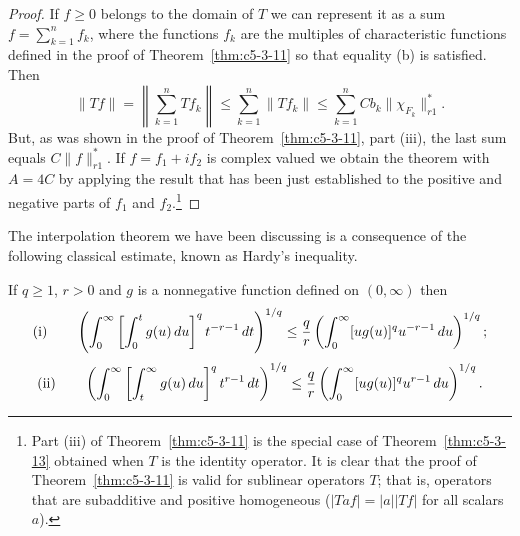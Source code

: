 \begin{proof}
If $f \geq 0$ belongs to the domain of $T$ we can represent it as a sum
$f = \sum_{k=1}^{n}f_{k}$, where the functions $f_{k}$ are the multiples of
characteristic functions defined in the proof of Theorem~\ref{thm:c5-3-11} so
that equality (b) is satisfied. Then
\[
\|Tf\|=\left\|\sum_{k=1}^{n}Tf_{k}\right\|\leq\sum_{k=1}^{n}\|Tf_{k}\|
\leq\sum_{k=1}^{n}Cb_{k}\|\chi_{F_{k}}\|_{r1}^{*}.
\]
But, as was shown in the proof of Theorem~\ref{thm:c5-3-11}, part (iii), the
last sum equals $C\|f\|_{r1}^{*}$. If $f = f_{1} + if_{2}$ is complex valued we
obtain the theorem with $A = 4C$ by applying the result that has been just
established to the positive and negative parts of $f_{1}$ and
$f_{2}$.\footnote{Part (iii) of Theorem~\ref{thm:c5-3-11} is the special case
of Theorem~\ref{thm:c5-3-13} obtained when $T$ is the identity operator. It is
clear that the proof of Theorem~\ref{thm:c5-3-11} is valid for sublinear
operators $T$; that is, operators that are subadditive and positive homogeneous
($|Taf| = |a||Tf|$ for all scalars $a$).}
\end{proof}

The interpolation theorem we have been discussing is a consequence of the
following classical estimate, known as Hardy's inequality.

\begin{lemma}\label{lem:c5-3-14}
If $q \geq 1$, $r > 0$ and $g$ is a nonnegative function defined on
$(0, \infty)$ then
\[
\textup{(i)}\qquad
\left(\int_{0}^{\infty}\left[\int_{0}^{t}g(u)\,du\right]^{q}t^{-r-1}\,dt\right)^{1/q}
\leq\frac{q}{r}\left(\int_{0}^{\infty}[ug(u)]^{q}u^{-r-1}\,du\right)^{1/q};
\]
\[
\textup{(ii)}\qquad
\left(\int_{0}^{\infty}\left[\int_{t}^{\infty}g(u)\,du\right]^{q}t^{r-1}\,dt\right)^{1/q}
\leq\frac{q}{r}\left(\int_{0}^{\infty}[ug(u)]^{q}u^{r-1}\,du\right)^{1/q}.
\]
\end{lemma}

